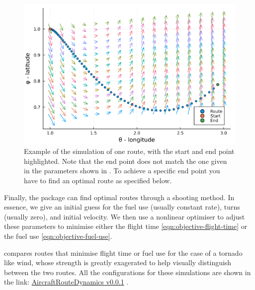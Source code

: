 \documentclass{article}
\begin{document}
\begin{figure}[h]
    \centering
    \includegraphics[width = 0.6\linewidth]{readme-1.png}
    \caption{Example of the simulation of one route, with the start and end point highlighted. Note that the end point does not match the one given in the parameters shown in . To achieve a specific end point you have to find an optimal route as specified below.}
    \label{fig:one-route}
\end{figure}

Finally, the package can find optimal routes through a shooting method. In essence, we give an initial guess for the fuel use (usually constant rate), turns (usually zero), and initial velocity. We then use a nonlinear optimiser to adjust these parameters to minimise either the flight time \eqref{eqn:objective-flight-time} or the fuel use \eqref{eqn:objective-fuel-use}.

 compares routes that minimise flight time or fuel use for the case of a tornado like wind, whose strength is greatly exagerated to help visually distinguish between the two routes. All the configurations for these simulations are shown in the link: \href{https://github.com/arturgower/AircraftRouteDynamics.jl/tree/v0.0.1}{AircraftRouteDynamics v0.0.1} .
\end{document}
